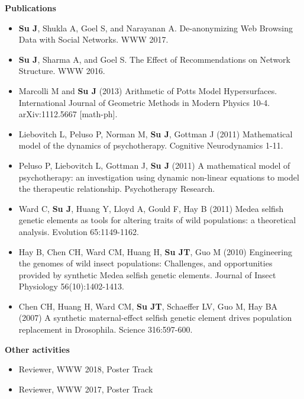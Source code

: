 \documentclass[letterpaper,10pt]{article}
\newcommand{\resheading}[1]{{\large \colorbox{mygrey}{\begin{minipage}{\textwidth}{\textbf{#1 \vphantom{p\^{E}}}}\end{minipage}}}}
\begin{document}
\resheading{Publications}
\begin{itemize}
\item \textbf{Su J}, Shukla A, Goel S, and Narayanan A.  De-anonymizing Web Browsing Data with Social Networks.  WWW 2017.
  \item \textbf{Su J}, Sharma A, and Goel S.  The Effect of Recommendations on Network Structure.  WWW 2016.
	\item Marcolli M and \textbf{Su J} (2013) Arithmetic of Potts Model Hypersurfaces.  International Journal of Geometric Methods in Modern Physics 10-4.  arXiv:1112.5667 [math-ph].
	\item Liebovitch L, Peluso P, Norman M, \textbf{Su J}, Gottman J (2011) Mathematical model of the dynamics of psychotherapy.  Cognitive Neurodynamics 1-11.
	\item Peluso P, Liebovitch L, Gottman J, \textbf{Su J} (2011) A mathematical model of psychotherapy: an investigation using dynamic non-linear equations to model the therapeutic relationship.  Psychotherapy Research.
	\item Ward C, \textbf{Su J}, Huang Y, Lloyd A, Gould F, Hay B (2011) Medea selfish genetic elements as tools for altering traits of wild populations: a theoretical analysis.  Evolution 65:1149-1162.
	\item Hay B, Chen CH, Ward CM, Huang H, \textbf{Su JT}, Guo M (2010) Engineering the genomes of wild insect populations: Challenges, and opportunities provided by synthetic Medea selfish genetic elements.  Journal of Insect Physiology 56(10):1402-1413.
	\item Chen CH, Huang H, Ward CM, \textbf{Su JT}, Schaeffer LV, Guo M, Hay BA (2007) A synthetic maternal-effect selfish genetic element drives population replacement in Drosophila. Science 316:597-600.
\end{itemize}

\resheading{Other activities}
\begin{itemize}
\item Reviewer, WWW 2018, Poster Track
\item Reviewer, WWW 2017, Poster Track
\end{itemize}
\end{document}
